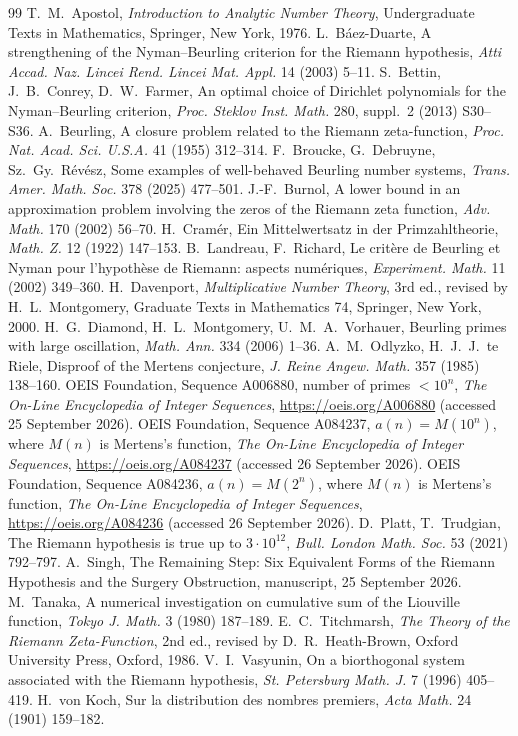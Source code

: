\documentclass[11pt]{article}
\theoremstyle{definition}\newtheorem{definition}[theorem]{Definition}
\theoremstyle{remark}\newtheorem{remark}[theorem]{Remark}
\begin{document}
\begin{thebibliography}{99}\small
{} T.~M.~Apostol, \emph{Introduction to Analytic Number Theory}, Undergraduate Texts in Mathematics, Springer, New York, 1976.
 L.~B\'aez-Duarte, A strengthening of the Nyman--Beurling criterion for the Riemann hypothesis, \emph{Atti Accad. Naz. Lincei Rend. Lincei Mat. Appl.} 14 (2003) 5--11.
 S.~Bettin, J.~B.~Conrey, D.~W.~Farmer, An optimal choice of Dirichlet polynomials for the Nyman--Beurling criterion, \emph{Proc. Steklov Inst. Math.} 280, suppl.~2 (2013) S30--S36.
 A.~Beurling, A closure problem related to the Riemann zeta-function, \emph{Proc. Nat. Acad. Sci. U.S.A.} 41 (1955) 312--314.
 F.~Broucke, G.~Debruyne, Sz.~Gy.~R\'ev\'esz, Some examples of well-behaved Beurling number systems, \emph{Trans. Amer. Math. Soc.} 378 (2025) 477--501.
 J.-F.~Burnol, A lower bound in an approximation problem involving the zeros of the Riemann zeta function, \emph{Adv. Math.} 170 (2002) 56--70.
 H.~Cram\'er, Ein Mittelwertsatz in der Primzahltheorie, \emph{Math. Z.} 12 (1922) 147--153.
 B.~Landreau, F.~Richard, Le crit\`ere de Beurling et Nyman pour l'hypoth\`ese de Riemann: aspects num\'eriques, \emph{Experiment. Math.} 11 (2002) 349--360.
 H.~Davenport, \emph{Multiplicative Number Theory}, 3rd ed., revised by H.~L.~Montgomery, Graduate Texts in Mathematics 74, Springer, New York, 2000.
 H.~G.~Diamond, H.~L.~Montgomery, U.~M.~A.~Vorhauer, Beurling primes with large oscillation, \emph{Math. Ann.} 334 (2006) 1--36.
 A.~M.~Odlyzko, H.~J.~J.~te Riele, Disproof of the Mertens conjecture, \emph{J. Reine Angew. Math.} 357 (1985) 138--160.
 OEIS Foundation, Sequence A006880, number of primes $<10^n$, \emph{The On-Line Encyclopedia of Integer Sequences}, \url{https://oeis.org/A006880} (accessed 25 September 2026).
 OEIS Foundation, Sequence A084237, $a(n)=M(10^n)$, where $M(n)$ is Mertens's function, \emph{The On-Line Encyclopedia of Integer Sequences}, \url{https://oeis.org/A084237} (accessed 26 September 2026).
 OEIS Foundation, Sequence A084236, $a(n)=M(2^n)$, where $M(n)$ is Mertens's function, \emph{The On-Line Encyclopedia of Integer Sequences}, \url{https://oeis.org/A084236} (accessed 26 September 2026).
 D.~Platt, T.~Trudgian, The Riemann hypothesis is true up to $3\cdot10^{12}$, \emph{Bull. London Math. Soc.} 53 (2021) 792--797.
 A.~Singh, The Remaining Step: Six Equivalent Forms of the Riemann Hypothesis and the Surgery Obstruction, manuscript, 25 September 2026.
 M.~Tanaka, A numerical investigation on cumulative sum of the Liouville function, \emph{Tokyo J. Math.} 3 (1980) 187--189.
 E.~C.~Titchmarsh, \emph{The Theory of the Riemann Zeta-Function}, 2nd ed., revised by D.~R.~Heath-Brown, Oxford University Press, Oxford, 1986.
 V.~I.~Vasyunin, On a biorthogonal system associated with the Riemann hypothesis, \emph{St. Petersburg Math. J.} 7 (1996) 405--419.
 H.~von Koch, Sur la distribution des nombres premiers, \emph{Acta Math.} 24 (1901) 159--182.
\end{thebibliography}
\end{document}
